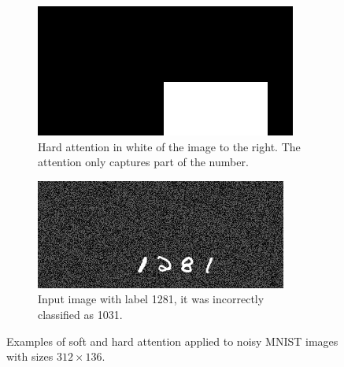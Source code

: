 \begin{figure}
    \begin{subfigure}[c]{0.45\textwidth}
        \centering    \includegraphics[scale=2.0]{resources/MNIST_hard_att/1281_att.jpg}
        \caption{Hard attention in white of the image to the right. The attention only captures part of the number.}
    \end{subfigure} \quad %
    \begin{subfigure}[c]{0.45\textwidth}
        \centering
        \includegraphics[scale=2.0]{resources/MNIST_hard_att/1281_fail_1031.jpg}
        \caption{Input image with label 1281, it was incorrectly classified as 1031.}
    \end{subfigure}
    \caption{Examples of soft and hard attention applied to noisy MNIST images with sizes $312 \times 136$.}
\end{figure}